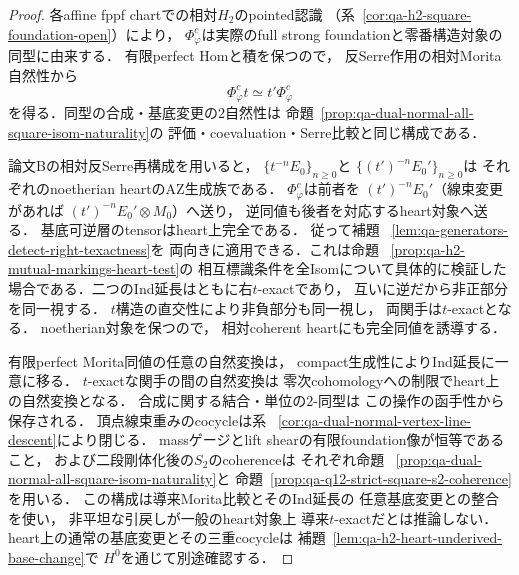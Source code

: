 \begin{proof}
各affine fppf chartでの相対$H_2$のpointed認識
（系~\ref{cor:qa-h2-square-foundation-open}）により，
$\Phi_\varphi^c$は実際のfull strong
foundationと零番構造対象の同型に由来する．
有限perfect Homと積を保つので，
反Serre作用の相対Morita自然性から
\[
 \Phi_\varphi^c t\simeq t'\Phi_\varphi^c
\]
を得る．同型の合成・基底変更の$2$自然性は
命題~\ref{prop:qa-dual-normal-all-square-isom-naturality}の
評価・coevaluation・Serre比較と同じ構成である．

論文Bの相対反Serre再構成を用いると，
$\{t^{-n}E_0\}_{n\ge0}$と
$\{(t')^{-n}E_0'\}_{n\ge0}$は
それぞれのnoetherian heartのAZ生成族である．
$\Phi_\varphi^c$は前者を
$(t')^{-n}E_0'$（線束変更があれば
$(t')^{-n}E_0'\otimes M_0$）へ送り，
逆同値も後者を対応するheart対象へ送る．
基底可逆層のtensorはheart上完全である．
従って補題~
\ref{lem:qa-generators-detect-right-texactness}を
両向きに適用できる．これは命題~
\ref{prop:qa-h2-mutual-markings-heart-test}の
相互標識条件を全Isomについて具体的に検証した
場合である．二つのInd延長はともに右$t$-exactであり，
互いに逆だから非正部分を同一視する．
$t$構造の直交性により非負部分も同一視し，
両関手は$t$-exactとなる．
noetherian対象を保つので，
相対coherent heartにも完全同値を誘導する．

有限perfect Morita同値の任意の自然変換は，
compact生成性によりInd延長に一意に移る．
$t$-exactな関手の間の自然変換は
零次cohomologyへの制限でheart上の自然変換となる．
合成に関する結合・単位の$2$-同型は
この操作の函手性から保存される．
頂点線束重みのcocycleは系~
\ref{cor:qa-dual-normal-vertex-line-descent}により閉じる．
massゲージとlift shearの有限foundation像が恒等であること，
および二段剛体化後の$S_2$のcoherenceは
それぞれ命題~
\ref{prop:qa-dual-normal-all-square-isom-naturality}と
命題~\ref{prop:qa-q12-strict-square-s2-coherence}を用いる．
この構成は導来Morita比較とそのInd延長の
任意基底変更との整合を使い，
非平坦な引戻しが一般のheart対象上
導来$t$-exactだとは推論しない．
heart上の通常の基底変更とその三重cocycleは
補題~\ref{lem:qa-h2-heart-underived-base-change}で
$H^0$を通じて別途確認する．
\end{proof}


